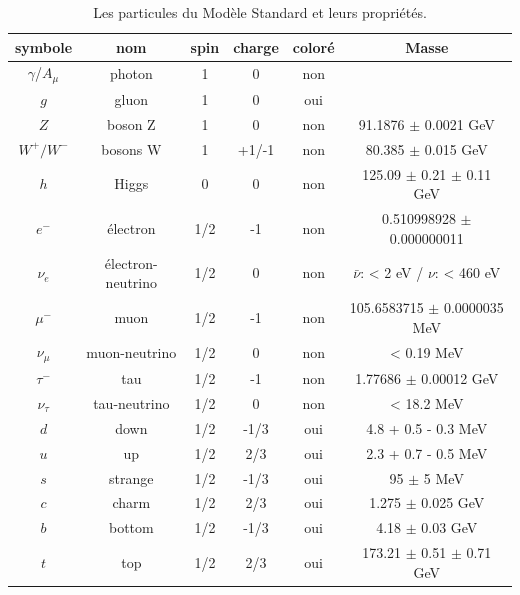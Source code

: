 \begin{table}[h!]
  \centering
  \begin{tabular}{|c|c|c|c|c|c|}
  \hline
  symbole   & nom                 & spin & charge & coloré & Masse \\ \hline
  $\gamma$/$A_\mu$  & photon              & 1    & 0     & non    &     \\ \hline
  $g$       & gluon               & 1    & 0     & oui    &     \\ \hline
  $Z$       & boson Z             & 1    & 0     & non    & 91.1876 $\pm$ 0.0021 GeV \cite{olive_review_2014} \\ \hline
  $W^+/W^-$ & bosons W            & 1    & +1/-1 & non    & 80.385 $\pm$ 0.015 GeV \cite{olive_review_2014} \\ \hline
  $h$       & Higgs               & 0    & 0     & non    & 125.09 $\pm$ 0.21 $\pm$ 0.11 GeV \cite{atlas_collaboration_combined_2015}  \\ \hline
  $e^-$     & \'electron          & 1/2  & -1    & non    & 0.510998928 $\pm$ 0.000000011 \cite{mohr_codata_2012} \\ \hline
  $\nu_e$   & \'electron-neutrino & 1/2  & 0     & non    & $\bar{\nu}$: < 2 eV \cite{olive_review_2014} / $\nu$: < 460 eV \cite{yasumi_mass_1994} \\ \hline
  $\mu^-$   & muon                & 1/2  & -1    & non    & 105.6583715 $\pm$ 0.0000035 MeV \cite{mohr_codata_2012}    \\ \hline
  $\nu_\mu$ & muon-neutrino       & 1/2  & 0     & non    & < 0.19 MeV \cite{olive_review_2014}    \\ \hline
  $\tau^-$  & tau                 & 1/2  & -1    & non    & 1.77686 $\pm$ 0.00012 GeV \cite{olive_review_2014}    \\ \hline
  $\nu_\tau$ & tau-neutrino       & 1/2  & 0     & non    &  < 18.2 MeV \cite{al_upper_1998}   \\ \hline
  $d$       & down                & 1/2  & -1/3  & oui    & 4.8 + 0.5 - 0.3 MeV \cite{olive_review_2014}     \\ \hline
  $u$       & up                  & 1/2  & 2/3   & oui    & 2.3 + 0.7 - 0.5 MeV \cite{olive_review_2014}    \\ \hline
  $s$       & strange             & 1/2  & -1/3  & oui    & 95 $\pm$ 5 MeV \cite{olive_review_2014}    \\ \hline
  $c$       & charm               & 1/2  & 2/3   & oui    & 1.275 $\pm$ 0.025 GeV \cite{olive_review_2014}    \\ \hline
  $b$       & bottom              & 1/2  & -1/3  & oui    & 4.18 $\pm$ 0.03 GeV \cite{olive_review_2014}    \\ \hline
  $t$       & top                 & 1/2  & 2/3   & oui    & 173.21 $\pm$ 0.51 $\pm$ 0.71 GeV \cite{olive_review_2014}    \\ \hline
\end{tabular}
\caption{Les particules du Modèle Standard et leurs propriétés.}
\label{tab:ms_particules}
\end{table}

